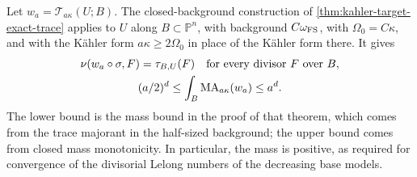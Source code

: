 Let $w_a=\mathcal T_{a\kappa}(U;B)$. The closed-background construction of \cref{thm:kahler-target-exact-trace} applies to $U$ along $B\subset\mathbb P^n$, with background $C\omega_{\mathrm{FS}}$, with $\Omega_0=C\kappa$, and with the K\"ahler form $a\kappa\geq2\Omega_0$ in place of the K\"ahler form there. It gives
\begin{equation}\label{eq:hopf-base-exact-trace}
 \begin{gathered}
 \nu(w_a\circ\sigma,F)=\tau_{B,U}(F)
 \quad\hbox{for every divisor }F\hbox{ over }B,\\
 (a/2)^d\leq\int_B\mathrm{MA}_{a\kappa}(w_a)\leq a^d.
 \end{gathered}
\end{equation}
The lower bound is the mass bound in the proof of that theorem, which comes from the trace majorant in the half-sized background; the upper bound comes from closed mass monotonicity. In particular, the mass is positive, as required for convergence of the divisorial Lelong numbers of the decreasing base models.

